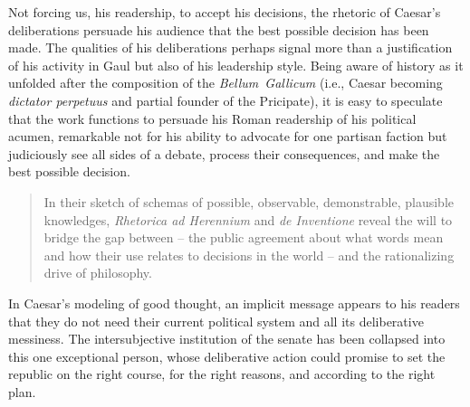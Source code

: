 \documentclass[12pt,letterpaper,oneside,final]{memoir}
\begin{document}
Not forcing us, his readership, to accept his decisions, the rhetoric of Caesar's deliberations persuade his audience that the best possible decision has been made. The qualities of his deliberations perhaps signal more than a justification of his activity in Gaul but also of his leadership style. Being aware of history as it unfolded after the composition of the \emph{Bellum~Gallicum} (i.e., Caesar becoming \emph{\textlatin{dictator perpetuus}} and partial founder of the Pricipate), it is easy to speculate that the work functions to persuade his Roman readership of his political acumen, remarkable not for his ability to advocate for one partisan faction but judiciously see all sides of a debate, process their consequences, and make the best possible decision. \blockquote[{\cite[74]{connolly2007}}]{In their sketch of schemas of possible, observable, demonstrable, plausible knowledges, \emph{Rhetorica ad Herennium} and \emph{de Inventione} reveal the will to bridge the gap between  -- the public agreement about what words mean and how their use relates to decisions in the world -- and the rationalizing drive of philosophy.} In Caesar's modeling of good thought, an implicit message appears to his readers that they do not need their current political system and all its deliberative messiness. The intersubjective institution of the senate has been collapsed into this one exceptional person, whose deliberative action could promise to set the republic on the right course, for the right reasons, and according to the right plan.
\end{document}

